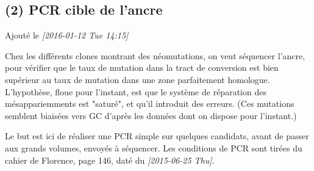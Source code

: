 \documentclass[9pt, oneside, twocolumn]{scrartcl}
\begin{document}
\subsection{(2) PCR cible de l'ancre}
\label{sec:orgheadline15}
Ajouté le \textit{[2016-01-12 Tue 14:15]}

Chez les différents clones montrant des néomutations, on veut séquencer l'ancre,
pour vérifier que le taux de mutation dans la tract de conversion est bien
supérieur au taux de mutation dans une zone parfaitement homologue. L'hypothèse,
floue pour l'instant, est que le système de réparation des mésappariemments est
"saturé", et qu'il introduit des erreurs. (Ces mutations semblent biaisées vers
GC d'après les données dont on dispose pour l'instant.)

Le but est ici de réaliser une PCR simple sur quelques candidats, avant de
passer aux grands volumes, envoyés à séquencer. Les conditions de PCR sont
tirées du cahier de Florence, page 146, daté du \textit{[2015-06-25 Thu]}. 
\end{document}
